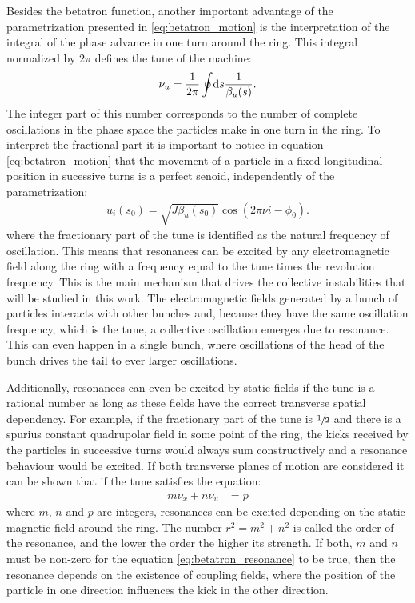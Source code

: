 \documentclass[
	12pt,				%
	openright,			%
	oneside,			%
	a4paper,		%
	chapter=TITLE,		%
	section=TITLE,		%
    brazil,				%
	english,			%
	sumario=tradicional,
	]{abntex2}
\begin{document}
	Besides the betatron function, another important advantage of the parametrization presented in \eqref{eq:betatron_motion} is the interpretation of the integral of the phase advance in one turn around the ring. This integral normalized by $2\pi$ defines the tune of the machine:
	\begin{align}
		\nu_u = \frac{1}{2\pi}\oint\!\text{d}s \frac{1}{\beta_u(s)}.
	\end{align}
	The integer part of this number corresponds to the number of complete oscillations in the phase space the particles make in one turn in the ring. To interpret the fractional part it is important to notice in equation \eqref{eq:betatron_motion} that the movement of a particle in a fixed longitudinal position in sucessive turns is a perfect senoid, independently of the parametrization:
	\begin{align}
		u_i(s_0) = \sqrt{J\beta_u(s_0)}\cos(2\pi\nu i -\phi_0).
	\end{align}
	where the fractionary part of the tune is identified as the natural frequency of oscillation. This means that resonances can be excited by any electromagnetic field along the ring with a frequency equal to the tune times the revolution frequency. This is the main mechanism that drives the collective instabilities that will be studied in this work. The electromagnetic fields generated by a bunch of particles interacts with other bunches and, because they have the same oscillation frequency, which is the tune, a collective oscillation emerges due to resonance. This can even happen in a single bunch, where oscillations of the head of the bunch drives the tail to ever larger oscillations.

	Additionally, resonances can even be excited by static fields if the tune is a rational number as long as these fields have the correct transverse spatial dependency. For example, if the fractionary part of the tune is $\sfrac12$ and there is a spurius constant quadrupolar field in some point of the ring, the kicks received by the particles in successive turns would always sum constructively and a resonance behaviour would be excited. If both transverse planes of motion are considered it can be shown that if the tune satisfies the equation:
	\begin{align}\label{eq:betatron_resonance}
		m\nu_x + n\nu_u &= p
	\end{align}
	where $m$, $n$ and $p$ are integers, resonances can be excited depending on the static magnetic field around the ring. The number $r^2 = m^2 + n^2$ is called the order of the resonance, and the lower the order the higher its strength. If both, $m$ and $n$ must be non-zero for the equation \eqref{eq:betatron_resonance} to be true, then the resonance depends on the existence of coupling fields, where the position of the particle in one direction influences the kick in the other direction.
\end{document}
